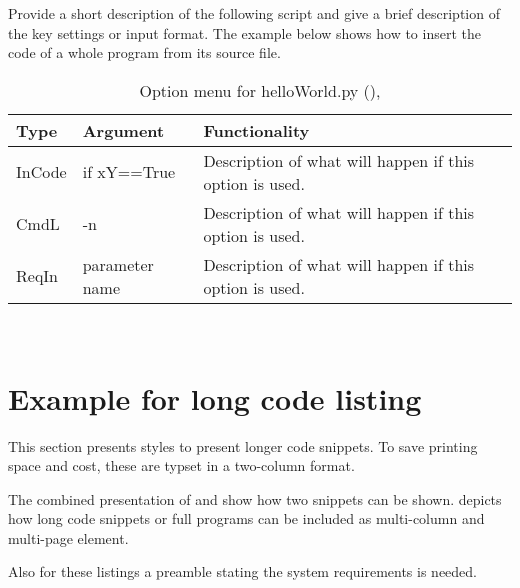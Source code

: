 Provide a short description of the following script and give a brief description of the key settings or input format. The example below shows how to insert the code of a whole program from its source file.




\vspace{5mm}
\begin{table}[h!]
    \caption{Option menu for helloWorld.py (), \label{cod:helloWorld}}

    \hfill\begin{tabular}{p{}p{}p{}}
    \hline\hline
    Type     & Argument &  Functionality \\ \hline
    InCode    & if \hbox{xY==True} & Description of what will happen if this option is used. \\
    CmdL    & -n & Description of what will happen if this option is used. \\
    ReqIn    & parameter name & Description of what will happen if this option is used. \\
    \hline
    \end{tabular}\hfill~
    
    \label{tab:functionalityTable}
\end{table}

\section{Example for long code listing \label{chap:appendixMesaInlists}}

This section presents styles to present longer code snippets. To save printing space and cost, these are typset in a two-column format. 

The combined presentation of  and  show how two snippets can be shown.  depicts how long code snippets or full programs can be included as multi-column and multi-page element.

Also for these listings a preamble stating the system requirements is needed.


